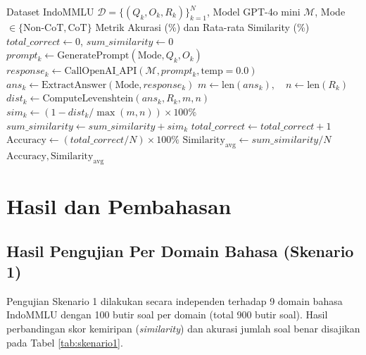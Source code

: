 \documentclass[10pt,a4paper]{article}
\begin{document}
\begin{algorithm}[H]
\caption{Prosedur Evaluasi Akurasi ChatGPT Menggunakan Levenshtein Distance}
\label{alg:eval_pipeline}
\fontsize{7.5pt}{9.5pt}\selectfont
\begin{algorithmic}[1]
\Require Dataset IndoMMLU $\mathcal{D} = \{(Q_k, O_k, R_k)\}_{k=1}^N$, Model GPT-4o mini $\mathcal{M}$, Mode $\in \{\text{Non-CoT}, \text{CoT}\}$
\Ensure Metrik Akurasi (\%) dan Rata-rata Similarity (\%)
\State $total\_correct \leftarrow 0$, $sum\_similarity \leftarrow 0$
    \State $prompt_k \leftarrow \text{GeneratePrompt}(\text{Mode}, Q_k, O_k)$
    \State $response_k \leftarrow \text{CallOpenAI\_API}(\mathcal{M}, prompt_k, \text{temp}=0.0)$
    \State $ans_k \leftarrow \text{ExtractAnswer}(\text{Mode}, response_k)$
    \State $m \leftarrow \text{len}(ans_k), \quad n \leftarrow \text{len}(R_k)$
    \State $dist_k \leftarrow \text{ComputeLevenshtein}(ans_k, R_k, m, n)$ 
    \State $sim_k \leftarrow (1 - dist_k / \max(m, n)) \times 100\%$ 
    \State $sum\_similarity \leftarrow sum\_similarity + sim_k$
        \State $total\_correct \leftarrow total\_correct + 1$
    \EndIf
\EndFor
\State $\text{Accuracy} \leftarrow (total\_correct / N) \times 100\%$
\State $\text{Similarity}_{\text{avg}} \leftarrow sum\_similarity / N$
\State \Return $\text{Accuracy}, \text{Similarity}_{\text{avg}}$
\end{algorithmic}
\end{algorithm}

\section{Hasil dan Pembahasan}

\subsection{Hasil Pengujian Per Domain Bahasa (Skenario 1)}
Pengujian Skenario 1 dilakukan secara independen terhadap 9 domain bahasa IndoMMLU dengan 100 butir soal per domain (total 900 butir soal). Hasil perbandingan skor kemiripan (\textit{similarity}) dan akurasi jumlah soal benar disajikan pada Tabel \ref{tab:skenario1}.
\end{document}
